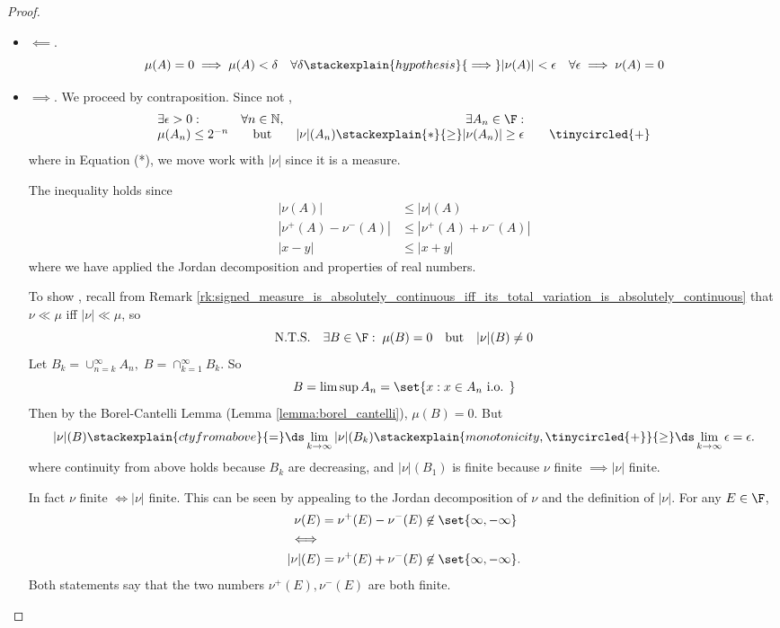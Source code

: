 \documentclass{article} %
\begin{document}
\begin{proof}
\begin{itemize}
\item $\boxed{\impliedby}$. 
\[  \mu(A) = 0 \implies \mu(A) < \delta \quad \forall \delta \stackexplain{hypothesis}{\implies} |\nu(A)| < \epsilon \quad \forall \epsilon \implies \nu(A) = 0\]
\item $\boxed{\implies}$.   We proceed by contraposition. Since not ,
\[
\begin{array}{lcrr}
\exists \epsilon > 0 : & \forall n \in \mathbb{N}, &  \exists A_n \in \F : & \\
\mu(A_n) \leq 2^{-n} & \text{ but } & |\nu|(A_n) \stackexplain{*}{\geq} |\nu(A_n) | \geq \epsilon 
& \quad \tinycircled{+} \end{array}
\]
where in Equation (*), we move work with $|\nu|$ since it is a measure.

{\tiny The inequality holds since  
\begin{align*}
|\nu(A)| &	\leq |\nu|(A) \\
|\nu^+(A) - \nu^-(A)| &\leq |\nu^+(A) + \nu^-(A)| \\
| x -y | &\leq |x + y|
\end{align*}
where we have applied the Jordan decomposition and properties of real numbers.
}

To show , recall from Remark \ref{rk:signed_measure_is_absolutely_continuous_iff_its_total_variation_is_absolutely_continuous} that $\nu \ll \mu$ iff $|\nu| \ll \mu$, so
\[  \text{N.T.S.} \quad  \exists B \in \F : \; \mu(B) = 0 \quad \text{but} \quad |\nu|(B) \neq 0 \]
Let $B_k = \cup_{n=k}^\infty A_n, \; B = \cap_{k=1}^\infty B_k$.  So 
\[  B = \limsup A_n = \set{x : x \in A_n \text{ i.o. }}\]
Then by the Borel-Cantelli Lemma (Lemma \ref{lemma:borel_cantelli}), $\mu(B)=0$.  But 
\[ |\nu|(B) \stackexplain{cty from above}{=} \ds\lim_{k \to \infty} |\nu| (B_k) \stackexplain{monotonicity, \tinycircled{+}}{\geq} \ds\lim_{k \to \infty} \epsilon = \epsilon.  \]
where continuity from above holds because $B_k$ are decreasing, and $|\nu|(B_1)$ is finite because $\nu$ finite $\implies |\nu|$ finite.

{\tiny In fact $\nu$ finite $\iff |\nu|$ finite. This  can be seen by appealing to the  Jordan decomposition of $\nu$ and the definition of $|\nu|$.  For any $E \in \F$, 
\begin{align*}
\nu(E) &= \nu^+(E) - \nu^-(E) \not\in \set{\infty, -\infty}\\
\iff &\\
|\nu|(E) &= \nu^+(E) + \nu^-(E) \not\in \set{\infty, -\infty}.
\end{align*}
%
Both statements say that the two numbers $\nu^+(E), \nu^-(E)$ are both finite.}
\end{itemize}	
\end{proof}
\end{document}
